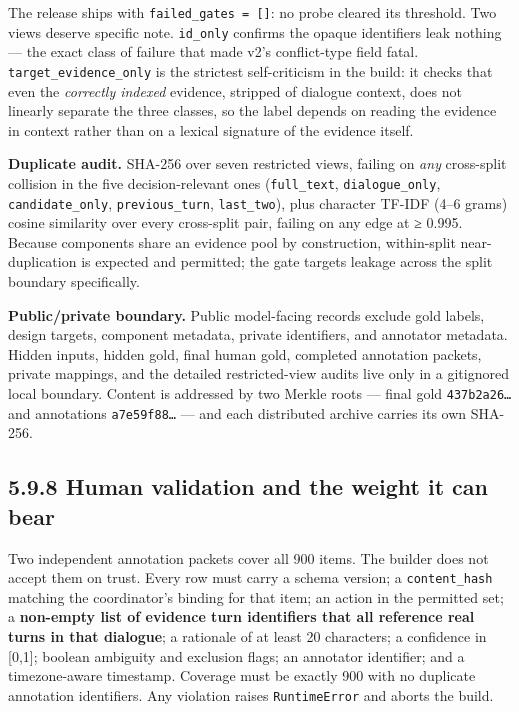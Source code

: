 The release ships with \texttt{failed\_gates\ =\ {[}{]}}: no probe
cleared its threshold. Two views deserve specific note.
\texttt{id\_only} confirms the opaque identifiers leak nothing --- the
exact class of failure that made v2's conflict-type field fatal.
\texttt{target\_evidence\_only} is the strictest self-criticism in the
build: it checks that even the \emph{correctly indexed} evidence,
stripped of dialogue context, does not linearly separate the three
classes, so the label depends on reading the evidence in context rather
than on a lexical signature of the evidence itself.

\textbf{Duplicate audit.} SHA-256 over seven restricted views, failing
on \emph{any} cross-split collision in the five decision-relevant ones
(\texttt{full\_text}, \texttt{dialogue\_only}, \texttt{candidate\_only},
\texttt{previous\_turn}, \texttt{last\_two}), plus character TF-IDF
(4--6 grams) cosine similarity over every cross-split pair, failing on
any edge at ≥ 0.995. Because components share an evidence pool by
construction, within-split near-duplication is expected and permitted;
the gate targets leakage across the split boundary specifically.

\textbf{Public/private boundary.} Public model-facing records exclude
gold labels, design targets, component metadata, private identifiers,
and annotator metadata. Hidden inputs, hidden gold, final human gold,
completed annotation packets, private mappings, and the detailed
restricted-view audits live only in a gitignored local boundary. Content
is addressed by two Merkle roots --- final gold \texttt{437b2a26…} and
annotations \texttt{a7e59f88…} --- and each distributed archive carries
its own SHA-256.

\subsection{5.9.8 Human validation and the weight it can
bear}\label{human-validation-and-the-weight-it-can-bear}

Two independent annotation packets cover all 900 items. The builder does
not accept them on trust. Every row must carry a schema version; a
\texttt{content\_hash} matching the coordinator's binding for that item;
an action in the permitted set; a \textbf{non-empty list of evidence
turn identifiers that all reference real turns in that dialogue}; a
rationale of at least 20 characters; a confidence in {[}0,1{]}; boolean
ambiguity and exclusion flags; an annotator identifier; and a
timezone-aware timestamp. Coverage must be exactly 900 with no duplicate
annotation identifiers. Any violation raises \texttt{RuntimeError} and
aborts the build.

